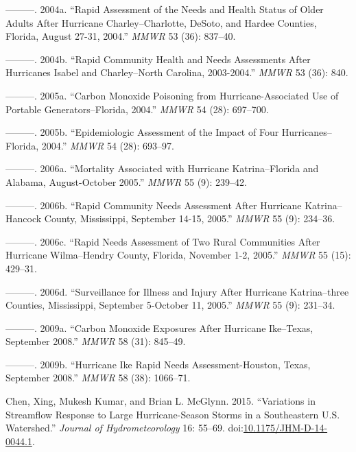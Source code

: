 \documentclass[]{elsarticle} %
\begin{document}
\hypertarget{ref-Centers2004Charley}{}
---------. 2004a. ``Rapid Assessment of the Needs and Health Status of
Older Adults After Hurricane Charley--Charlotte, DeSoto, and Hardee
Counties, Florida, August 27-31, 2004.'' \emph{MMWR} 53 (36): 837--40.

\hypertarget{ref-Centers2004Isabel}{}
---------. 2004b. ``Rapid Community Health and Needs Assessments After
Hurricanes Isabel and Charley--North Carolina, 2003-2004.'' \emph{MMWR}
53 (36): 840.

\hypertarget{ref-Centers2005CO}{}
---------. 2005a. ``Carbon Monoxide Poisoning from Hurricane-Associated
Use of Portable Generators--Florida, 2004.'' \emph{MMWR} 54 (28):
697--700.

\hypertarget{ref-Centers2005Four}{}
---------. 2005b. ``Epidemiologic Assessment of the Impact of Four
Hurricanes--Florida, 2004.'' \emph{MMWR} 54 (28): 693--97.

\hypertarget{ref-Centers2006Katrina3}{}
---------. 2006a. ``Mortality Associated with Hurricane Katrina--Florida
and Alabama, August-October 2005.'' \emph{MMWR} 55 (9): 239--42.

\hypertarget{ref-Centers2006Katrina}{}
---------. 2006b. ``Rapid Community Needs Assessment After Hurricane
Katrina--Hancock County, Mississippi, September 14-15, 2005.''
\emph{MMWR} 55 (9): 234--36.

\hypertarget{ref-Centers2006Wilma}{}
---------. 2006c. ``Rapid Needs Assessment of Two Rural Communities
After Hurricane Wilma--Hendry County, Florida, November 1-2, 2005.''
\emph{MMWR} 55 (15): 429--31.

\hypertarget{ref-Centers2006Katrina2}{}
---------. 2006d. ``Surveillance for Illness and Injury After Hurricane
Katrina--three Counties, Mississippi, September 5-October 11, 2005.''
\emph{MMWR} 55 (9): 231--34.

\hypertarget{ref-Centers2009CO}{}
---------. 2009a. ``Carbon Monoxide Exposures After Hurricane
Ike--Texas, September 2008.'' \emph{MMWR} 58 (31): 845--49.

\hypertarget{ref-Centers2009Ike}{}
---------. 2009b. ``Hurricane Ike Rapid Needs Assessment-Houston, Texas,
September 2008.'' \emph{MMWR} 58 (38): 1066--71.

\hypertarget{ref-Chen2015}{}
Chen, Xing, Mukesh Kumar, and Brian L. McGlynn. 2015. ``Variations in
Streamflow Response to Large Hurricane-Season Storms in a Southeastern
U.S. Watershed.'' \emph{Journal of Hydrometeorology} 16: 55--69.
doi:\href{https://doi.org/10.1175/JHM-D-14-0044.1}{10.1175/JHM-D-14-0044.1}.
\end{document}
